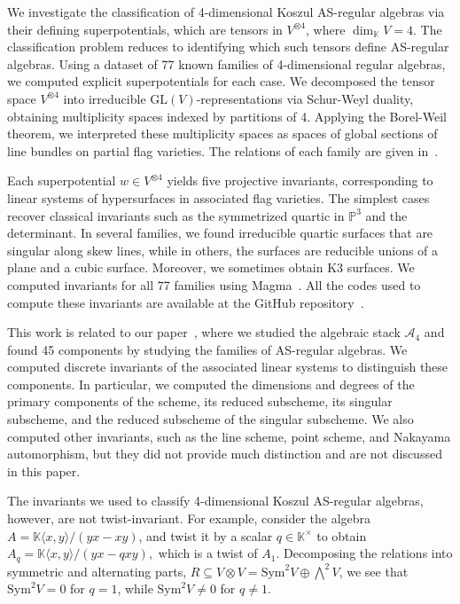 \documentclass{amsart}
\begin{document}
We investigate the classification of 4-dimensional Koszul AS-regular algebras via their defining superpotentials, which are tensors in \( V^{\otimes 4} \), where \( \dim_{\mathbb{K}} V = 4 \). The classification problem reduces to identifying which such tensors define AS-regular algebras. Using a dataset of 77 known families of 4-dimensional regular algebras, we computed explicit superpotentials for each case. We decomposed the tensor space \( V^{\otimes 4} \) into irreducible \( \mathrm{GL}(V) \)-representations via Schur-Weyl duality, obtaining multiplicity spaces indexed by partitions of 4. Applying the Borel-Weil theorem, we interpreted these multiplicity spaces as spaces of global sections of line bundles on partial flag varieties. The relations of each family are given in~\cite[Appendix]{bhatoy-colin-felix-ravali-components}.

Each superpotential \( w \in V^{\otimes 4} \) yields five projective invariants, corresponding to linear systems of hypersurfaces in associated flag varieties. The simplest cases recover classical invariants such as the symmetrized quartic in \( \mathbb{P}^3 \) and the determinant. In several families, we found irreducible quartic surfaces that are singular along skew lines, while in others, the surfaces are reducible unions of a plane and a cubic surface. Moreover, we sometimes obtain K3 surfaces. We computed invariants for all 77 families using Magma~\cite{magma}. All the codes used to compute these invariants are available at the GitHub repository~\cite{vishal2025}.

This work is related to our paper~\cite{bhatoy-colin-felix-ravali-components}, where we studied the algebraic stack $\mathcal{A}_4$ and found 45 components by studying the families of AS-regular algebras. We computed discrete invariants of the associated linear systems to distinguish these components. In particular, we computed the dimensions and degrees of the primary components of the scheme, its reduced subscheme, its singular subscheme, and the reduced subscheme of the singular subscheme. We also computed other invariants, such as the line scheme, point scheme, and Nakayama automorphism, but they did not provide much distinction and are not discussed in this paper.

The invariants we used to classify 4-dimensional Koszul AS-regular algebras, however, are not twist-invariant. For example, consider the algebra \( A = \mathbb{K}\langle x,y\rangle / (yx - xy) \), 
and twist it by a scalar \( q \in \mathbb{K}^{\times} \) to obtain 
\( A_q = \mathbb{K}\langle x,y\rangle / (yx - q xy), \) which is a twist of $A_1.$ Decomposing the relations into symmetric and alternating parts, 
\( R \subseteq V \otimes V = \mathrm{Sym}^2 V \oplus \bigwedge^2 V \), we see that \( \mathrm{Sym}^2 V = 0 \) for \( q = 1 \), while \( \mathrm{Sym}^2 V \neq 0 \) for \( q \neq 1 \). 
\end{document}
